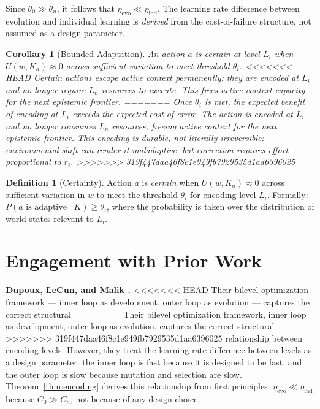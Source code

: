 \documentclass[11pt]{article}
\newtheorem{corollary}[theorem]{Corollary}
\theoremstyle{definition}
\newtheorem{definition}{Definition}
\begin{document}
Since $\theta_0 \gg \theta_n$, it follows that
$\eta_{\mathrm{evo}} \ll \eta_{\mathrm{ind}}$. The learning rate
difference between evolution and individual learning is \emph{derived}
from the cost-of-failure structure, not assumed as a design parameter.

\begin{corollary}[Bounded Adaptation]
\label{cor:bounded}
An action $a$ is \emph{certain} at level $L_i$ when $U(w, K_a)
\approx 0$ across sufficient variation to meet threshold $\theta_i$.
<<<<<<< HEAD
Certain actions escape active context permanently: they are encoded at
$L_i$ and no longer require $L_n$ resources to execute. This frees
active context capacity for the next epistemic frontier.
=======
Once $\theta_i$ is met, the expected benefit of encoding at $L_i$
exceeds the expected cost of error. The action is encoded at $L_i$ and
no longer consumes $L_n$ resources, freeing active context for the
next epistemic frontier. This encoding is durable, not literally
irreversible: environmental shift can render it maladaptive, but
correction requires effort proportional to $r_i$.
>>>>>>> 319f447daa46f8c1e949fb7929535d1aa6396025
\end{corollary}

\begin{definition}[Certainty]
\label{def:certain}
Action $a$ is \emph{certain} when $U(w, K_a) \approx 0$ across
sufficient variation in $w$ to meet the threshold $\theta_i$ for
encoding level $L_i$. Formally: $P(\text{$a$ is adaptive} \mid K)
\geq \theta_i$, where the probability is taken over the distribution
of world states relevant to $L_i$.
\end{definition}

\section{Engagement with Prior Work}
\label{sec:prior}

\textbf{Dupoux, LeCun, and Malik \cite{DupouxLeCunMalik2026}.}
<<<<<<< HEAD
Their bilevel optimization framework --- inner loop as development,
outer loop as evolution --- captures the correct structural
=======
Their bilevel optimization framework, inner loop as development,
outer loop as evolution, captures the correct structural
>>>>>>> 319f447daa46f8c1e949fb7929535d1aa6396025
relationship between encoding levels. However, they treat the learning
rate difference between levels as a design parameter: the inner loop
is fast because it is designed to be fast, and the outer loop is slow
because mutation and selection are slow. Theorem~\ref{thm:encoding}
derives this relationship from first principles: $\eta_{\mathrm{evo}}
\ll \eta_{\mathrm{ind}}$ because $C_0 \gg C_n$, not because of any
design choice.
\end{document}
